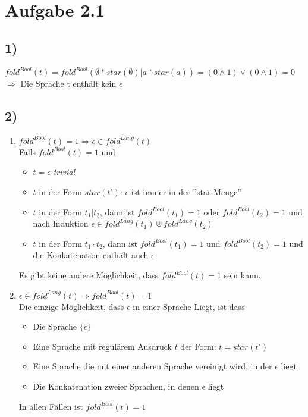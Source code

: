 \section*{Aufgabe 2.1}
\subsection*{1)}
$fold^{Bool}(t) =
fold^{Bool}(\emptyset * star(\emptyset) | a * star(a)) = 
(0 \wedge 1) \vee (0 \wedge 1) = 0$ \\
$\Rightarrow$ Die Sprache t enthält kein $\epsilon$
\subsection*{2)}
\begin{enumerate}
    \item $fold^{Bool}(t)=1\Rightarrow\epsilon\in fold^{Lang}(t)$\\ 
    Falls $fold^{Bool}(t)=1$ und
    \begin{itemize}
        \item $t=\epsilon$ \textit{trivial}
        \item $t$ in der Form $star(t')$: $\epsilon$ ist immer in der ''star-Menge''
        \item $t$ in der Form $t_1 | t_2$, dann ist 
        $fold^{Bool}(t_1)=1$ oder $fold^{Bool}(t_2)=1$ und nach Induktion $\epsilon\in fold^{Lang}(t_1)\Cup fold^{Lang}(t_2)$
        \item $t$ in der Form $t_1 \cdot t_2$, dann ist $fold^{Bool}(t_1)=1$ und $fold^{Bool}(t_2)=1$ und die Konkatenation enthält auch $\epsilon$
    \end{itemize}
    Es gibt keine andere Möglichkeit, dass $fold^{Bool}(t)=1$ sein kann.
    \item $\epsilon\in fold^{Lang}(t) \Rightarrow fold^{Bool}(t)=1$\\
    Die einzige Möglichkeit, dass $\epsilon$ in einer Sprache Liegt, ist dass
    \begin{itemize}
        \item Die Sprache $\{\epsilon\}$
        \item Eine Sprache mit regulärem Ausdruck $t$ der Form: $t=star(t')$
        \item Eine Sprache die mit einer anderen Sprache vereinigt wird, in der $\epsilon$ liegt
        \item Die Konkatenation zweier Sprachen, in denen $\epsilon$ liegt
    \end{itemize}
    In allen Fällen ist $fold^{Bool}(t)=1$
\end{enumerate}
